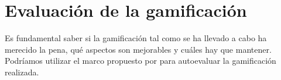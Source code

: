 


\section{Evaluación de la gamificación}

Es fundamental saber si la gamificación tal como se ha llevado a cabo ha merecido la pena, qué aspectos son mejorables y cuáles hay que mantener.
%
Podríamos utilizar el marco propuesto por \cite{EvaluacionGamificacion} para autoevaluar la gamificación realizada.

